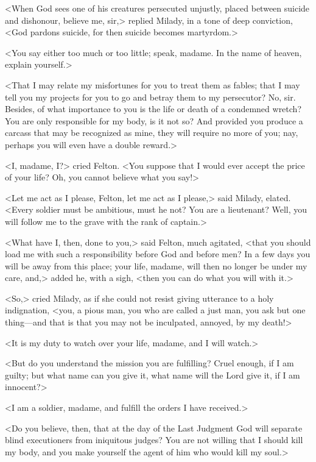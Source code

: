 <When God sees one of his creatures persecuted unjustly, placed between suicide and dishonour, believe me, sir,> replied Milady, in a tone of deep conviction, <God pardons suicide, for then suicide becomes martyrdom.> 

<You say either too much or too little; speak, madame. In the name of heaven, explain yourself.> 

<That I may relate my misfortunes for you to treat them as fables; that I may tell you my projects for you to go and betray them to my persecutor? No, sir. Besides, of what importance to you is the life or death of a condemned wretch? You are only responsible for my body, is it not so? And provided you produce a carcass that may be recognized as mine, they will require no more of you; nay, perhaps you will even have a double reward.> 

<I, madame, I?> cried Felton. <You suppose that I would ever accept the price of your life? Oh, you cannot believe what you say!> 

<Let me act as I please, Felton, let me act as I please,> said Milady, elated. <Every soldier must be ambitious, must he not? You are a lieutenant? Well, you will follow me to the grave with the rank of captain.> 

<What have I, then, done to you,> said Felton, much agitated, <that you should load me with such a responsibility before God and before men? In a few days you will be away from this place; your life, madame, will then no longer be under my care, and,> added he, with a sigh, <then you can do what you will with it.> 

<So,> cried Milady, as if she could not resist giving utterance to a holy indignation, <you, a pious man, you who are called a just man, you ask but one thing---and that is that you may not be inculpated, annoyed, by my death!> 

<It is my duty to watch over your life, madame, and I will watch.> 

<But do you understand the mission you are fulfilling? Cruel enough, if I am guilty; but what name can you give it, what name will the Lord give it, if I am innocent?> 

<I am a soldier, madame, and fulfill the orders I have received.> 

<Do you believe, then, that at the day of the Last Judgment God will separate blind executioners from iniquitous judges? You are not willing that I should kill my body, and you make yourself the agent of him who would kill my soul.> 

